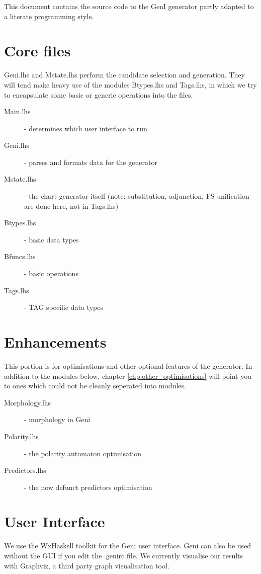 \documentclass[a4paper,11pt]{report}
\begin{document}
This document contains the source code to the GenI generator 
partly adapted to a literate programming style.  

\section{Core files}

Geni.lhs and Mstate.lhs perform the candidate selection and generation.
They will tend make heavy use of the modules Btypes.lhs and Tags.lhs, in
which we try to encapsulate some basic or generic operations into the
files.

\begin{description}
 \item[Main.lhs] - determines which user interface to run 
 \item[Geni.lhs] - parses and formats data for the generator 
 \item[Mstate.lhs] - the chart generator itself (note: substitution,
 adjunction, FS unification are done here, not in Tags.lhs)
 \item[Btypes.lhs] - basic data types 
 \item[Bfuncs.lhs] - basic operations 
 \item[Tags.lhs] - TAG specific data types
\end{description}

\section{Enhancements}

This portion is for optimisations and other optional features of the
generator.
In addition to the modules below, chapter \ref{chp:other_optimisations}
will point you to ones which could not be cleanly seperated into
modules.

\begin{description}
 \item[Morphology.lhs] - morphology in Geni  
 \item[Polarity.lhs]   - the polarity automaton optimisation 
 \item[Predictors.lhs] - the now defunct predictors optimisation
\end{description}

\section{User Interface}

We use the WxHaskell toolkit for the Geni user interface.  Geni
can also be used without the GUI if you edit the .genirc file.
We currently visualise our results with Graphviz, a third party graph
visualisation tool.
\end{document}
